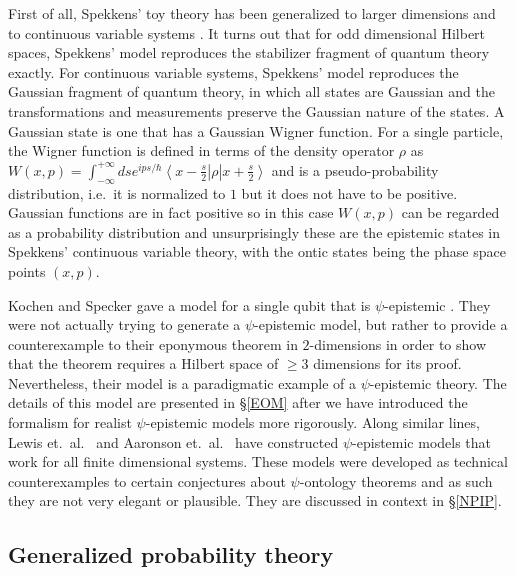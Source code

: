 \documentclass[DIV=calc,fontsize=12pt]{scrartcl} %
\theoremstyle{definition}
\theoremstyle{plain}
\newcommand{\Ket}[1]{\ensuremath{\left \vert #1 \right \rangle}}
\newcommand{\Bra}[1]{\ensuremath{\left \langle #1 \right \vert}}
\begin{document}
First of all, Spekkens' toy theory has been generalized to larger
dimensions \cite{Schreiber} and to continuous variable systems
\cite{Bartlett2012}.  It turns out that for odd dimensional Hilbert
spaces, Spekkens' model reproduces the stabilizer fragment of quantum
theory exactly.  For continuous variable systems, Spekkens' model
reproduces the Gaussian fragment of quantum theory, in which all
states are Gaussian and the transformations and measurements preserve
the Gaussian nature of the states.  A Gaussian state is one that has a
Gaussian Wigner function.  For a single particle, the Wigner function
is defined in terms of the density operator $\rho$ as $W(x,p) =
\int_{-\infty}^{+\infty} ds e^{ips/\hbar} \Bra{x - \frac{s}{2}} \rho
\Ket{x + \frac{s}{2}}$ and is a pseudo-probability distribution, i.e.\
it is normalized to $1$ but it does not have to be positive.  Gaussian
functions are in fact positive so in this case $W(x,p)$ can be
regarded as a probability distribution and unsurprisingly these are
the epistemic states in Spekkens' continuous variable theory, with the
ontic states being the phase space points $(x,p)$.

Kochen and Specker gave a model for a single qubit that is
$\psi$-epistemic \cite{Kochen1967}.  They were not actually trying to
generate a $\psi$-epistemic model, but rather to provide a
counterexample to their eponymous theorem in $2$-dimensions in order
to show that the theorem requires a Hilbert space of $\geq 3$
dimensions for its proof.  Nevertheless, their model is a paradigmatic
example of a $\psi$-epistemic theory.  The details of this model are
presented in \S\ref{EOM} after we have introduced the formalism for
realist $\psi$-epistemic models more rigorously.  Along similar lines,
Lewis et.\ al.\ \cite{Lewis2012} and Aaronson et.\ al.\
\cite{Aaronson2013} have constructed $\psi$-epistemic models that work
for all finite dimensional systems.  These models were developed as
technical counterexamples to certain conjectures about $\psi$-ontology
theorems and as such they are not very elegant or plausible.  They are
discussed in context in \S\ref{NPIP}.

\subsection{Generalized probability theory}

\label{GenProb}
\end{document}

